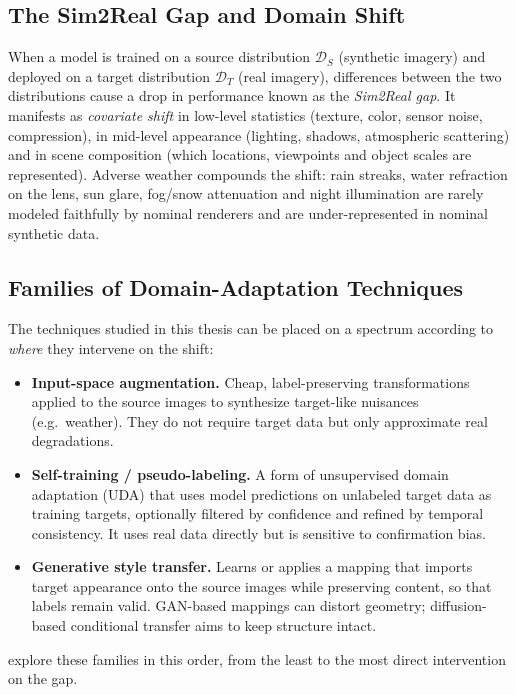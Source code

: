 \subsection{The Sim2Real Gap and Domain Shift}
\label{subsec:bg-sim2real}
When a model is trained on a source distribution $\mathcal{D}_S$ (synthetic
imagery) and deployed on a target distribution $\mathcal{D}_T$ (real imagery),
differences between the two distributions cause a drop in performance known as the
\emph{Sim2Real gap}. It manifests as \emph{covariate shift} in low-level statistics
(texture, color, sensor noise, compression), in mid-level appearance (lighting,
shadows, atmospheric scattering) and in scene composition (which locations,
viewpoints and object scales are represented). Adverse weather compounds the shift:
rain streaks, water refraction on the lens, sun glare, fog/snow attenuation and
night illumination are rarely modeled faithfully by nominal renderers and are
under-represented in nominal synthetic data.

\subsection{Families of Domain-Adaptation Techniques}
\label{subsec:bg-da}
The techniques studied in this thesis can be placed on a spectrum according to
\emph{where} they intervene on the shift:
\begin{itemize}
    \item \textbf{Input-space augmentation.} Cheap, label-preserving transformations
    applied to the source images to synthesize target-like nuisances (e.g.\ weather).
    They do not require target data but only approximate real degradations.
    \item \textbf{Self-training / pseudo-labeling.} A form of unsupervised domain
    adaptation (\ac{UDA}) that uses model predictions on unlabeled target data as
    training targets, optionally filtered by confidence and refined by temporal
    consistency. It uses real data directly but is sensitive to confirmation bias.
    \item \textbf{Generative style transfer.} Learns or applies a mapping that
    imports target appearance onto the source images while preserving content, so
    that labels remain valid. GAN-based mappings can distort geometry; diffusion-based
    conditional transfer aims to keep structure intact.
\end{itemize}
 explore these
families in this order, from the least to the most direct intervention on the gap.

